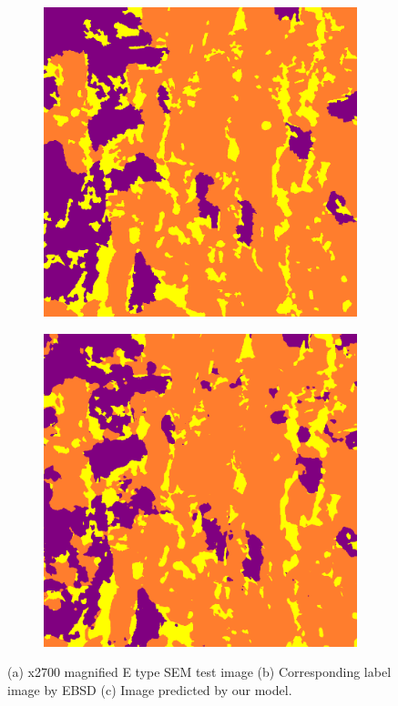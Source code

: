 \documentclass[]{article}
\begin{document}
\begin{figure}[ht]
\begin{subfigure}[b]{0.3\textwidth}
		\includegraphics[width=\textwidth]{images/inference/SameSteelSameMag-L.png}
		\caption{}
		\label{fig:samesteelsamemag-label}
	\end{subfigure}
	\hfill
	\begin{subfigure}[b]{0.3\textwidth}
		\centering
		\includegraphics[width=\textwidth]{images/inference/SameSteelSameMag-P.png}
		\caption{}
		\label{fig:samesteelsamemag-pred}
	\end{subfigure}
	
	\caption{(a) x2700 magnified E type SEM test image (b) Corresponding label image by EBSD (c) Image predicted by our model.}
	\label{fig:samesteelsamemag}
\end{figure}
\end{document}
